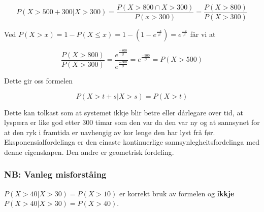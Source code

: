 \begin{equation}
    P(X > 500 + 300 | X > 300) = \frac{P(X > 800 \cap X > 300)}{P(x > 300)} = \frac{P(X > 800)}{P(X > 300)} 
\end{equation}

Ved $P(X > x) = 1 - P(X \leq x) = 1 - (1 - e^\frac{-x}{\beta}) = e^\frac{-x}{\beta}$ får vi at

\begin{equation}
    \frac{P(X > 800)}{P(X > 300)} = \frac{e^\frac{-800}{\beta}}{e^\frac{-300}{\beta}} = e^\frac{-500}{\beta} = P(X > 500)
\end{equation}

Dette gir oss formelen

\begin{equation}
    P(X > t + s | X > s) = P(X > t)
\end{equation}

Dette kan tolkast som at systemet ikkje blir betre eller dårlegare over tid, at lyspæra er like god etter 300 timar som den var da den var ny og at sannsynet for at den ryk i framtida er uavhengig av kor lenge den har lyst frå før. Eksponensialfordelinga er den einaste kontinuerlige sannsynlegheitsfordelinga med denne eigenskapen. Den andre er geometrisk fordeling. 

\subsubsection{NB: Vanleg misforståing}
$P(X > 40 | X > 30) = P(X > 10)$ er korrekt bruk av formelen og \textbf{ikkje}
$P(X > 40 | X > 30) = P(X > 40)$. 

